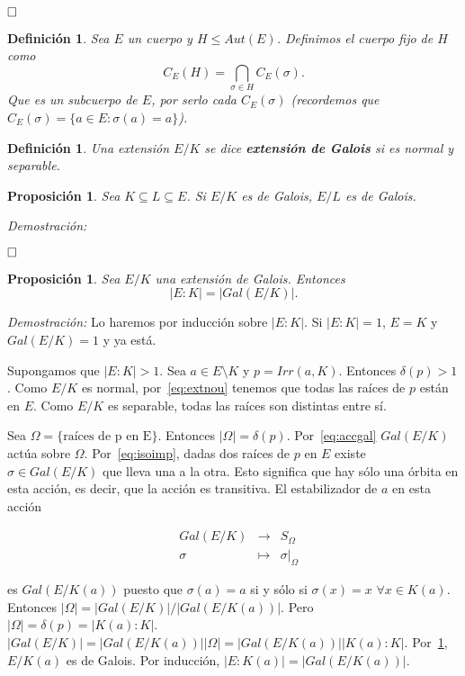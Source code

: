 \documentclass[12pt]{article}
\newtheorem{proposition}[theorem]{Proposición}
\newtheorem{definition}[theorem]{Definición}
\begin{document}
$\hfill \square$

\begin{definition} Sea $E$ un cuerpo y $H \leq Aut(E)$. Definimos el cuerpo fijo de $H$ como $$C_{E}(H) = \bigcap_{\sigma \in H} C_{E}(\sigma).$$ Que es un subcuerpo de $E$, por serlo cada $C_{E}(\sigma)$ (recordemos que $C_{E}(\sigma) = \lbrace a \in E :\sigma (a) = a \rbrace$).
\end{definition}
\begin{definition} Una extensión $E/K$ se dice \textbf{extensión de Galois} si es normal y separable.
\end{definition}

\begin{proposition}\label{eq:cuerpIntGal} Sea $K\subseteq L \subseteq E$. Si $E/K$ es de Galois, $E/L$ es de Galois.
\end{proposition}
\emph{Demostración: }

$\hfill \square$

\begin{proposition}Sea $E/K$ una extensión de Galois. Entonces $$|E:K| = |Gal(E/K)|.$$
\end{proposition}
\emph{Demostración: } Lo haremos por inducción sobre $|E:K|$. Si $|E:K| = 1$, $E=K$ y $Gal(E/K)= 1$ y ya está.

Supongamos que $|E:K|>1$. Sea $a \in E \setminus K$ y $p = Irr(a,K)$. Entonces $\delta(p)>1$. Como $E/K$ es normal, por~\ref{eq:extnou} tenemos que todas las raíces de $p$ están en $E$. Como $E/K$ es separable, todas las raíces son distintas entre sí.

Sea $\Omega = \lbrace \text{raíces de p en E} \rbrace$. Entonces $|\Omega | = \delta(p)$. Por~\ref{eq:accgal} $Gal(E/K)$ actúa sobre $\Omega$. Por~\ref{eq:isoimp}, dadas dos raíces de $p$ en $E$ existe $\sigma \in Gal(E/K)$ que lleva una a la otra. Esto significa que hay sólo una órbita en esta acción, es decir, que la acción es transitiva. El estabilizador de $a$ en esta acción 

$$\begin{array}{rccl}
&Gal(E/K)&\longrightarrow &S_{\Omega} \\
&\sigma& \longmapsto &\left.\sigma \right|_\Omega 
\end{array}
$$

es $Gal(E/K(a))$ puesto que $\sigma(a) = a$ si y sólo si $\sigma (x) = x$ \hspace{0.1cm} $\forall x \in K(a)$. Entonces $|\Omega| = |Gal(E/K)|/|Gal(E/K(a))|$. Pero $|\Omega| = \delta(p) = |K(a):K|$. $|Gal(E/K)| = |Gal(E/K(a))| |\Omega| = |Gal(E/K(a))||K(a):K|.$ Por~\ref{eq:cuerpIntGal}, $E/K(a)$ es de Galois. Por inducción, $|E:K(a)| = |Gal(E/K(a))|$. 
\end{document}
